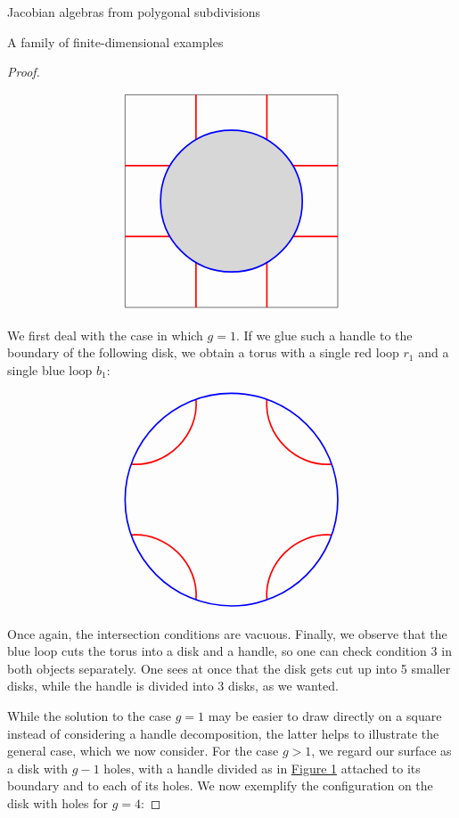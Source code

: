 \begin{chapter}{Jacobian algebras from polygonal subdivisions}
\begin{section}{A family of finite-dimensional examples}
\begin{proof}
\begin{figure}[h]
\label{divided-handle}
\[
\begin{tikzpicture}
\draw (0,0) node[minimum size=6cm,draw] {};

\fill [black,opacity=.15] circle (2cm);

\draw[red, very thick] (-3,1) -- (-1.73,1);
\draw[red, very thick] (-3,-1) -- (-1.73,-1);

\draw[red, very thick] (3,1) -- (1.73,1);
\draw[red, very thick] (3,-1) -- (1.73,-1);

\draw[red, very thick] (1,-3) -- (1,-1.73);
\draw[red, very thick] (-1,-3) -- (-1,-1.73);

\draw[red, very thick] (1,3) -- (1,1.73);
\draw[red, very thick] (-1,3) -- (-1,1.73);

\draw[blue, very thick] (0,0) circle (2cm);
\end{tikzpicture}
\]
\caption{}
\end{figure}

We first deal with the case in which $g=1$. If we glue such a handle to the boundary of the following disk, we obtain a torus with a single red loop $r_1$ and a single blue loop $b_1$:

\begin{figure}[h]
\[
\begin{tikzpicture}

\draw[red, very thick] (-2.83,1) to [bend right=50] (-1,2.83);
\draw[red, very thick] (2.83,1) to [bend left=50] (1,2.83);
\draw[red, very thick] (2.83,-1) to [bend right=50] (1,-2.83);
\draw[red, very thick] (-2.83,-1) to [bend left=50] (-1,-2.83);

\draw[blue, very thick] (0,0) circle (3cm);
\end{tikzpicture}
\]
\end{figure}

Once again, the intersection conditions are vacuous. Finally, we observe that the blue loop cuts the torus into a disk and a handle, so one can check condition $3$ in both objects separately. One sees at once that the disk gets cut up into 5 smaller disks, while the handle is divided into $3$ disks, as we wanted.

While the solution to the case $g=1$ may be easier to draw directly on a square instead of considering a handle decomposition, the latter helps to illustrate the general case, which we now consider. For the case $g>1$, we regard our surface as a disk with $g-1$ holes, with a handle divided as in \hyperref[divided-handle]{Figure \ref*{divided-handle}} attached to its boundary and to each of its holes. We now exemplify the configuration on the disk with holes for $g=4$:


\end{proof}
\end{section}
\end{chapter}

